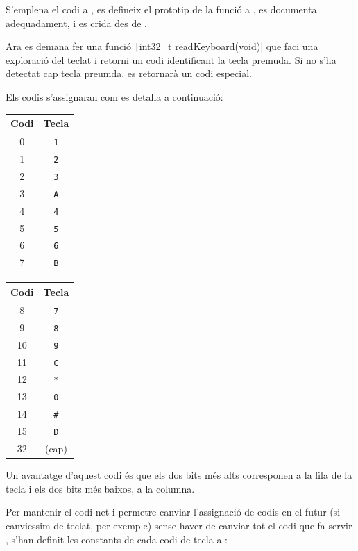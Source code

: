 S'emplena el codi a , es defineix el prototip de la funció a
, es documenta adequadament, i es crida des de .

Ara es demana fer una funció \texttt|int32_t readKeyboard(void)| que faci
una exploració del teclat i retorni un codi identificant la tecla premuda.
Si no s'ha detectat cap tecla preumda, es retornarà un codi especial.

Els codis s'assignaran com es detalla a continuació:

\begin{multicols}{2}
\centering

\begin{tabular}{cc}
\toprule
Codi & Tecla \\ \midrule
0 & \texttt{1} \\
1 & \texttt{2} \\
2 & \texttt{3} \\
3 & \texttt{A} \\
4 & \texttt{4} \\
5 & \texttt{5} \\
6 & \texttt{6} \\
7 & \texttt{B} \\
\bottomrule
\end{tabular}

\begin{tabular}{cc}
\toprule
Codi & Tecla \\ \midrule
8 & \texttt{7} \\
9 & \texttt{8} \\
10 & \texttt{9} \\
11 & \texttt{C} \\
12 & \texttt{*} \\
13 & \texttt{0} \\
14 & \texttt{\#} \\
15 & \texttt{D} \\
32 & (cap) \\
\bottomrule
\end{tabular}

\end{multicols}

Un avantatge d'aquest codi és que els dos bits més alts corresponen a la fila
de la tecla i els dos bits més baixos, a la columna.

\voluntari
Per mantenir el codi net i permetre canviar l'assignació de codis en el futur (si
canviessim de teclat, per exemple) sense haver de canviar tot el codi que fa servir
, s'han definit les constants de cada codi de tecla a :


